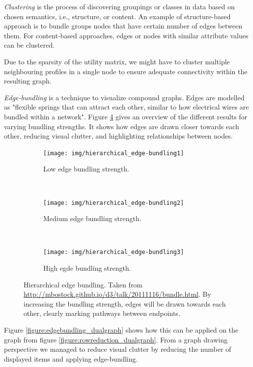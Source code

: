 \emph{Clustering} is the process of discovering groupings or classes in data based on chosen semantics, i.e., structure, or content. An example of structure-based approach is to bundle groups nodes that have certain number of edges between them. For content-based approaches, edges or nodes with similar attribute values can be clustered.

Due to the sparsity of the utility matrix, we might have to cluster multiple neighbouring profiles in a single node to ensure adequate connectivity within the resulting graph.

\emph{Edge-bundling} is a technique to visualize compound graphs\cite{Holten:2006:HEB:1187627.1187772}. Edges are modelled as "flexible springs that can attract each other, similar to how electrical wires are bundled within a network"\cite{holten:2009}. Figure \ref{figure:hierarchical_edge_bundling} gives an overview of the different results for varying bundling strengths. It shows how edges are drawn closer towards each other, reducing visual clutter, and highlighting relationships between nodes.


\begin{figure}
	\centering
	\begin{subfigure}[b]{0.3\textwidth}
					\centering
					\texttt{[image: img/hierarchical\_edge-bundling1]}
					\caption{Low edge bundling strength.}
					\label{figure:hierarchical_edge-bundling1}
	\end{subfigure}%
	~
	\begin{subfigure}[b]{0.3\textwidth}
					\centering
					\texttt{[image: img/hierarchical\_edge-bundling2]}
					\caption{Medium edge bundling strength.}
					\label{figure:hierarchical_edge-bundling2}
	\end{subfigure}
	~
	\begin{subfigure}[b]{0.3\textwidth}
					\centering
					\texttt{[image: img/hierarchical\_edge-bundling3]}
					\caption{High egde bundling strength.}
					\label{figure:hierarchical_edge-bundling3}
	\end{subfigure}
	\caption{Hierarchical edge bundling. Taken from \url{http://mbostock.github.io/d3/talk/20111116/bundle.html}. By increasing the bundling strength, edges will be drawn towards each other, clearly marking pathways between endpoints.}%
	\label{figure:hierarchical_edge_bundling}%
\end{figure}


Figure \ref{figure:edgebundling_dualgraph} shows how this can be applied on the graph from figure \ref{figure:rowreduction_dualgraph}. From a graph drawing perspective we managed to reduce visual clutter by reducing the number of displayed items and applying edge-bundling\cite{herman:2000, Holten:2006:HEB:1187627.1187772}.

